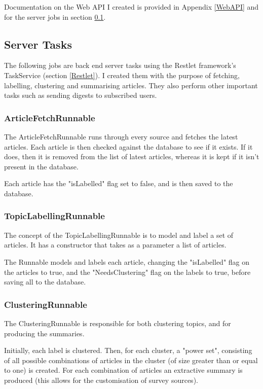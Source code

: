 \documentclass[12pt]{article}
\begin{document}
Documentation on the Web API I created is provided in Appendix \ref{WebAPI} and for the server jobs in section \ref{ServerTasks}.

\subsection{Server Tasks}

\label{ServerTasks}

The following jobs are back end server tasks using the Restlet framework's TaskService (section \ref{Restlet}). I created them with the purpose of fetching, labelling, clustering and summarising articles. They also perform other important tasks such as sending digests to subscribed users.  

\subsubsection{ArticleFetchRunnable}

The ArticleFetchRunnable runs through every source and fetches the latest articles. Each article is then checked against the database to see if it exists. If it does, then it is removed from the list of latest articles, whereas it is kept if it isn't present in the database.

Each article has the "isLabelled" flag set to false, and is then saved to the database.

\subsubsection{TopicLabellingRunnable}

The concept of the TopicLabellingRunnable is to model and label a set of articles. It has a constructor that takes as a parameter a list of articles. 

The Runnable models and labels each article, changing the "isLabelled" flag on the articles to true, and the "NeedsClustering" flag on the labels to true, before saving all to the database. 

\subsubsection{ClusteringRunnable}

The ClusteringRunnable is responsible for both clustering topics, and for producing the summaries. 

Initially, each label is clustered. Then, for each cluster, a "power set", consisting of all possible combinations of articles in the cluster (of size greater than or equal to one) is created. For each combination of articles an extractive summary is produced (this allows for the customisation of survey sources). 
\end{document}
